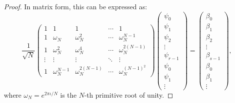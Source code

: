 \begin{proof}
In matrix form, this can be expressed as:
\[
\frac{1}{\sqrt{N}}\begin{pmatrix} 
1 & 1 & 1 & \cdots & 1 \\
1 & \omega_N & \omega_N^2 & \cdots & \omega_N^{N-1} \\
1 & \omega_N^2 & \omega_N^4 & \cdots & \omega_N^{2(N-1)} \\
\vdots & \vdots & \vdots & \ddots & \vdots \\
1 & \omega_N^{N-1} & \omega_N^{2(N-1)} & \cdots & \omega_N^{(N-1)^2}
\end{pmatrix}
\begin{pmatrix}
\psi_0 \\ \psi_1 \\ \psi_2 \\ \vdots \\ \psi_{r-1} \\ \psi_0 \\ \psi_1 \\ \vdots
\end{pmatrix}
=
\begin{pmatrix}
\beta_0 \\ \beta_1 \\ \beta_2 \\ \vdots \\ \beta_{s-1} \\ \beta_0 \\ \beta_1 \\ \vdots
\end{pmatrix},
\]
where $\omega_N = e^{2\pi\iota/N}$ is the $N$-th primitive root of unity.


\end{proof}

